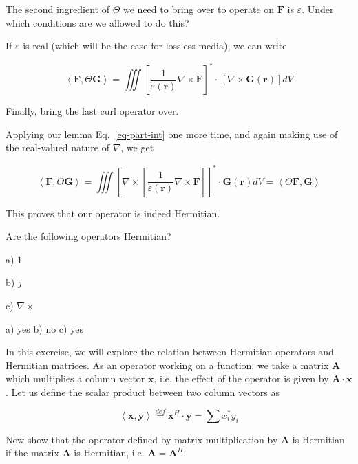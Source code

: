 \begin{cue}
The second ingredient of $\Theta$ we need to bring over to operate on $ {\mathbf F}$ is  $\varepsilon$. Under which conditions are we allowed to do this?   
\end{cue}

If $\varepsilon$ is real (which will be the case for lossless media), we can write

\begin{equation}
\left\langle {\mathbf F}, \Theta {\mathbf G}\right\rangle = \iiint \left [\frac{1}{\varepsilon({\mathbf r})} \nabla \times {\mathbf F}\right]^* \cdot \, \left[ \nabla \times {\mathbf G({\mathbf r})}  \right ] dV 
\end{equation} 

\begin{cue}
Finally, bring the last curl operator over.
\end{cue}

Applying our lemma Eq.~\ref{eq-part-int} one more time, and again making use of the real-valued nature of $\nabla$, we get

\begin{equation}
\left\langle {\mathbf F}, \Theta {\mathbf G}\right\rangle = \iiint \left[ \nabla \times  \left [\frac{1}{\varepsilon({\mathbf r})} \nabla \times {\mathbf F}\right] \right ] ^* \cdot {\mathbf G({\mathbf r})}  dV  = \left\langle \Theta {\mathbf F}, {\mathbf G}\right\rangle 
\end{equation} 

This proves that our operator is indeed Hermitian.

\pagebreak

\begin{exer}
Are the following operators Hermitian?

a) $1$
  
b) $j$
  
c) $\nabla \times $

\begin{sol}
a) yes b) no c) yes
\end{sol}
\end{exer}

\begin{exer}
In this exercise, we will explore the relation between Hermitian operators and Hermitian matrices. As an operator working on a function, we take a matrix ${\mathbf A}$ which multiplies a column vector ${\mathbf x}$, i.e. the effect of the operator is given by ${\mathbf A} \cdot {\mathbf x}$. Let us define the scalar product between two column vectors as

$$\left\langle {\mathbf x},{\mathbf y} \right\rangle \stackrel{def}{=} {\mathbf x}^H \cdot {\mathbf y} = \sum{x_i^* y_i}$$

Now show that the operator defined by matrix multiplication by ${\mathbf A}$ is Hermitian if the matrix ${\mathbf A}$ is Hermitian, i.e. ${\mathbf A} = {\mathbf A}^H$.
\end{exer}


